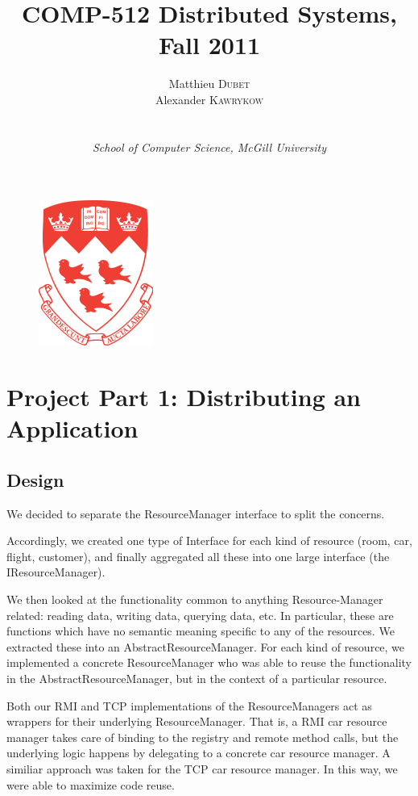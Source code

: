 \documentclass[a4paper]{article}
\title{COMP-512 Distributed Systems, Fall 2011}
\author{
Matthieu \textsc{Dubet} \\
Alexander \textsc{Kawrykow} \\ \\ \\
\emph{School of Computer Science, McGill University }
}
\begin{document}
\maketitle
\begin{figure}
  \centering
	\includegraphics[scale=0.8]{mcgill_logo.png}
  \label{mcgill}
\end{figure}
\clearpage
\tableofcontents
\clearpage
\section{Project Part 1: Distributing an Application}
\subsection{Design}

We decided to separate the ResourceManager interface to split the concerns. 

Accordingly, we created one type of Interface for each kind of resource (room, car, flight, customer), and finally aggregated all these into one large interface (the IResourceManager). 

We then looked at the functionality common to anything Resource-Manager related: reading data, writing data, querying data, etc. In particular,
these are functions which have no semantic meaning specific to any of the resources. We extracted these into an AbstractResourceManager.
For each kind of resource, we implemented a concrete ResourceManager who was able to reuse the functionality in the AbstractResourceManager, 
but in the context of a particular resource. 


Both our RMI and TCP implementations of the ResourceManagers act as wrappers for their underlying ResourceManager. That is, a RMI car resource manager
takes care of binding to the registry and remote method calls, but the underlying logic happens by delegating to a concrete car resource manager. A
similiar approach was taken for the TCP car resource manager. In this way, we were able to maximize code reuse. 
\end{document}
